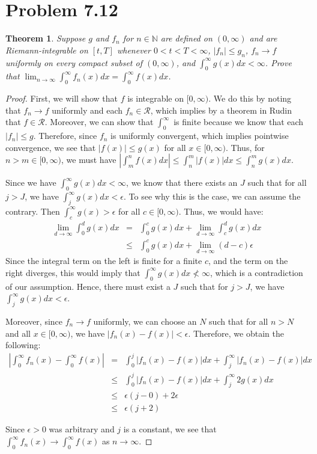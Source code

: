 \documentclass[psamsfonts]{amsart}
\newtheorem{thm}{Theorem}[section]
\theoremstyle{definition}
\theoremstyle{remark}
\numberwithin{equation}{section}
\begin{document}
\section{Problem 7.12}

\begin{thm}
Suppose $g$ and $f_n$ for $n \in \mathbb{N}$ are defined on $(0,\infty)$ and are Riemann-integrable on $[t,T]$ whenever $0 < t < T < \infty$, $|f_n| \leq g_n$, $f_n \to f$ uniformly on every compact subset of $(0,\infty)$, and $\int_0^\infty g(x) dx < \infty$. Prove that $\lim_{n \to \infty} \int_0^\infty f_n(x) dx = \int_0^\infty f(x) dx$. 
\end{thm}

\begin{proof}
First, we will show that $f$ is integrable on $[0,\infty)$. We do this by noting that $f_n \to f$ uniformly and each $f_n \in \mathscr{R}$, which implies by a theorem in Rudin that $f \in \mathscr{R}$. Moreover, we can show that $\int_0^\infty$ is finite because we know that each $|f_n| \leq g$. Therefore, since $f_n$ is uniformly convergent, which implies pointwise convergence, we see that $|f(x)| \leq g(x)$ for all $x \in [0,\infty)$. Thus, for $n > m \in [0,\infty)$, we must have $|\int_m^n f(x) dx | \leq \int_n^m |f(x)| dx \leq \int_n^m g(x) dx$. 

Since we have $\int_0^\infty g(x) dx < \infty$, we know that there exists an $J$ such that for all $j > J$, we have $\int_j^\infty g(x) dx < \epsilon$. To see why this is the case, we can assume the contrary. Then $\int_c^\infty g(x) > \epsilon$ for all $c \in [0,\infty)$. Thus, we would have:
\begin{eqnarray}
\lim_{d \to \infty} \int_0^d g(x) dx &=& \int_0^c g(x) dx + \lim_{d \to \infty} \int_c^d g(x) dx \\
&\leq& \int_0^c g(x) dx + \lim_{d \to \infty} (d - c) \epsilon 
\end{eqnarray}
Since the integral term on the left is finite for a finite $c$, and the term on the right diverges, this would imply that $\int_0^\infty g(x) dx \nless \infty$, which is a contradiction of our assumption. Hence, there must exist a $J$ such that for $j > J$, we have $\int_j^\infty g(x) dx < \epsilon$.

Moreover, since $f_n \to f$ uniformly, we can choose an $N$ such that for all $n > N$ and all $x \in [0,\infty)$, we have $|f_n(x) - f(x)| < \epsilon$. Therefore, we obtain the following:
\begin{eqnarray}
\left| \int_0^\infty f_n(x) - \int_0^\infty f(x) \right| &=& \int_0^j |f_n(x) - f(x)| dx + \int_j^\infty |f_n(x) - f(x)| dx \\
&\leq& \int_0^j |f_n(x) - f(x)| dx + \int_j^\infty 2 g(x) dx \\
&\leq& \epsilon (j - 0)  + 2 \epsilon \\
&\leq& \epsilon( j + 2)
\end{eqnarray}

Since $\epsilon > 0$ was arbitrary and $j$ is a constant, we see that $\int_0^\infty f_n(x) \to \int_0^\infty f(x)$ as $n \to \infty$. 
\end{proof}
\end{document}

